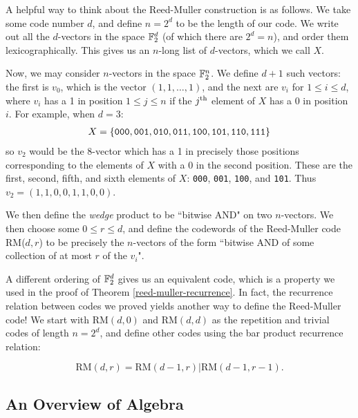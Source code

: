 \documentclass{article}
\begin{document}
\begin{remark}
    A helpful way to think about the Reed-Muller construction is as follows.
    We take some code number $d$, and define $n = 2^d$ to be the length of our code.
    We write out all the $d$-vectors in the space $\mathbb{F}_2^d$ (of which there are $2^d = n$), and order them lexicographically. This gives us an $n$-long list of $d$-vectors, which we call $X$.
    
    Now, we may consider $n$-vectors in the space $\mathbb{F}_2^n$. We define $d+1$ such vectors: the first is $v_0$, which is the vector $(1, 1, \dots, 1)$, and the next are $v_i$ for $1 \leq i \leq d$, where $v_i$ has a 1 in position $1 \leq j \leq n$ if the $j^{\text{th}}$ element of $X$ has a 0 in position $i$. For example, when $d = 3$:
    \begin{align*}
    	X = \left\lbrace 
		\texttt{000}, \texttt{001}, \texttt{010}, \texttt{011},
		\texttt{100}, \texttt{101}, \texttt{110}, \texttt{111}
		 \right\rbrace
	\end{align*}
	so $v_2$ would be the 8-vector which has a 1 in precisely those positions corresponding to the elements of $X$ with a 0 in the second position. These are the first, second, fifth, and sixth elements of $X$: 
	\texttt{000}, \texttt{001}, \texttt{100}, and \texttt{101}. Thus $v_2 = (1, 1, 0, 0, 1, 1, 0, 0)$.
	
	We then define the \textit{wedge} product to be ``bitwise AND" on two $n$-vectors. We then choose some $0 \leq r \leq d$, and define the codewords of the Reed-Muller code RM($d, r$) to be precisely the $n$-vectors of the form ``bitwise AND of some collection of at most $r$ of the $v_i$".
\end{remark}

\begin{note}
	A different ordering of $\mathbb{F}_2^d$ gives us an equivalent code, which is a property we used in the proof of Theorem \ref{reed-muller-recurrence}. In fact, the recurrence relation between codes we proved yields another way to define the Reed-Muller code! We start with $\mathrm{RM}(d, 0)$ and $\mathrm{RM}(d, d)$ as the repetition and trivial codes of length $n = 2^d$, and define other codes using the bar product recurrence relation:
\end{note}
\[
\mathrm{RM}(d, r) = \mathrm{RM}(d-1, r)|\mathrm{RM}(d-1, r-1).
\]


\pagebreak
\subsection{An Overview of Algebra}
\label{section-algebraic-grm-overview}
\end{document}

